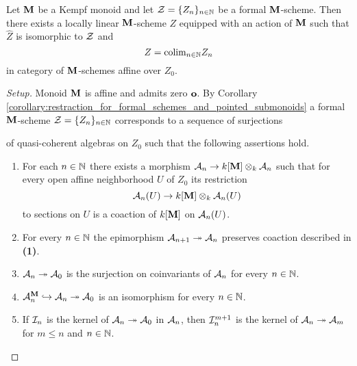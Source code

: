 \begin{theorem}\label{theorem:every_formal_over_kempf_monoid_is_formal_neighborhood}
Let $\mathbf{M}$ be a Kempf monoid and let ${\mathcal Z} = \{Z_n\}_{n\in {\mathbb N}}$ be a formal $\mathbf{M}$-scheme. Then there exists a locally linear $\mathbf{M}$-scheme $Z$ equipped with an action of $\mathbf{M}$ such that $\widehat{Z}$ is isomorphic to ${\mathcal Z}$ and
$$Z = \mathrm{colim}_{n\in {\mathbb N}}Z_n$$
in category of $\mathbf{M}$-schemes affine over $Z_0$.
\end{theorem}
\begin{proof}[Setup]
Monoid $\mathbf{M}$ is affine and admits zero $\mathbf{o}$. By Corollary \ref{corollary:restraction_for_formal_schemes_and_pointed_submonoids} a formal $\mathbf{M}$-scheme ${\mathcal Z} = \{Z_n\}_{n\in {\mathbb N}}$ corresponds to a sequence of surjections
\begin{center}
\end{center}
of quasi-coherent algebras on $Z_0$ such that the following assertions hold.
\begin{enumerate}[label=\textbf{(\arabic*)}, leftmargin=3.0em]
\item For each $n\in {\mathbb N}$ there exists a morphism ${\mathcal A}_n\rightarrow k[\mathbf{M}]\otimes_k{\mathcal A}_n$ such that for every open affine neighborhood $U$ of $Z_0$ its restriction 
$${\mathcal A}_n(U)\rightarrow k[\mathbf{M}]\otimes_k {\mathcal A}_n(U)$$
to sections on $U$ is a coaction of $k[\mathbf{M}]$ on ${\mathcal A}_n(U)$.
\item For every $n\in {\mathbb N}$ the epimorphism ${\mathcal A}_{n+1} \twoheadrightarrow {\mathcal A}_n$ preserves coaction described in \textbf{(1)}.
\item ${\mathcal A}_n\twoheadrightarrow {\mathcal A}_0$ is the surjection on coinvariants of ${\mathcal A}_n$ for every $n\in {\mathbb N}$.
\item ${\mathcal A}_n^{\mathbf{M}}\hookrightarrow {\mathcal A}_n\twoheadrightarrow {\mathcal A}_0$ is an isomorphism for every $n\in {\mathbb N}$.
\item If ${\mathcal I}_n$ is the kernel of ${\mathcal A}_n\twoheadrightarrow {\mathcal A}_0$ in ${\mathcal A}_n$, then ${\mathcal I}_n^{m+1}$ is the kernel of ${\mathcal A}_n\twoheadrightarrow {\mathcal A}_m$ for $m\leq n$ and $n\in {\mathbb N}$.

\end{enumerate}
\end{proof}
